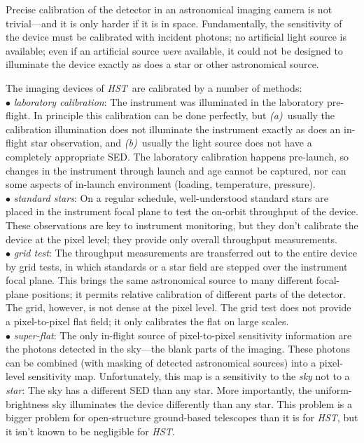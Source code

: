 \documentclass[12pt]{article}
\newcommand{\project}[1]{\textsl{#1}}
\newcommand{\HST}{\project{HST}}
\begin{document}
%
%
\justification          %

\textbf{}


Precise calibration of the detector in an astronomical imaging camera
is not trivial---and it is only harder if it is in space.
Fundamentally, the sensitivity of the device must be calibrated with
incident photons; no artificial light source is available; even if an
artificial source \emph{were} available, it could not be designed to
illuminate the device exactly as does a star or other astronomical
source.

The imaging devices of \HST\ are calibrated by a number of
methods:
\\ $\bullet$ \project{laboratory calibration}: The instrument was illuminated
  in the laboratory pre-flight.  In principle this calibration can be
  done perfectly, but \textsl{(a)}~usually the calibration
  illumination does not illuminate the instrument exactly as does an
  in-flight star observation, and \textsl{(b)}~usually the light
  source does not have a completely appropriate SED.  The laboratory
  calibration happens pre-launch, so changes in the instrument through
  launch and age cannot be captured, nor can some aspects of in-launch
  environment (loading, temperature, pressure).
\\ $\bullet$ \project{standard stars}: On a regular schedule, well-understood
  standard stars are placed in the instrument focal plane to test the
  on-orbit throughput of the device.  These observations are key to
  instrument monitoring, but they don't calibrate the device at the
  pixel level; they provide only overall throughput measurements.
\\ $\bullet$ \project{grid test}: The throughput measurements are transferred
  out to the entire device by grid tests, in which standards or a star
  field are stepped over the instrument focal plane.  This brings the
  same astronomical source to many different focal-plane positions; it
  permits relative calibration of different parts of the detector.
  The grid, however, is not dense at the pixel level.  The grid test
  does not provide a pixel-to-pixel flat field; it only calibrates the
  flat on large scales.
\\ $\bullet$ \project{super-flat}: The only in-flight source of
  pixel-to-pixel sensitivity information are the photons detected in
  the sky---the blank parts of the imaging.  These photons can be
  combined (with masking of detected astronomical sources) into a
  pixel-level sensitivity map.  Unfortunately, this map is a
  sensitivity to the \emph{sky} not to a \emph{star}: The sky has a
  different SED than any star.  More importantly, the
  uniform-brightness sky illuminates the device differently than any
  star.  This problem is a bigger problem for open-structure
  ground-based telescopes than it is for \HST, but it isn't known
  to be negligible for \HST.
\end{document}
